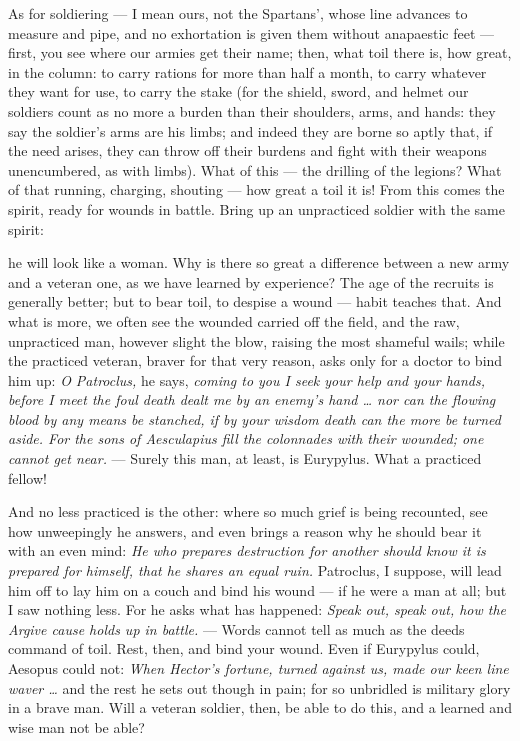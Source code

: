  As for soldiering — I mean ours, not the Spartans', whose line advances to measure and pipe, and no exhortation is given them without anapaestic feet — first, you see where our armies get their name; then, what toil there is, how great, in the column: to carry rations for more than half a month, to carry whatever they want for use, to carry the stake (for the shield, sword, and helmet our soldiers count as no more a burden than their shoulders, arms, and hands: they say the soldier's arms are his limbs; and indeed they are borne so aptly that, if the need arises, they can throw off their burdens and fight with their weapons unencumbered, as with limbs). What of this — the drilling of the legions? What of that running, charging, shouting — how great a toil it is! From this comes the spirit, ready for wounds in battle. Bring up an unpracticed soldier with the same spirit:

 he will look like a woman. Why is there so great a difference between a new army and a veteran one, as we have learned by experience? The age of the recruits is generally better; but to bear toil, to despise a wound — habit teaches that. And what is more, we often see the wounded carried off the field, and the raw, unpracticed man, however slight the blow, raising the most shameful wails; while the practiced veteran, braver for that very reason, asks only for a doctor to bind him up: \textit{O Patroclus,} he says, \textit{coming to you I seek your help and your hands, before I meet the foul death dealt me by an enemy's hand … nor can the flowing blood by any means be stanched, if by your wisdom death can the more be turned aside. For the sons of Aesculapius fill the colonnades with their wounded; one cannot get near.} — Surely this man, at least, is Eurypylus. What a practiced fellow!

 And no less practiced is the other: where so much grief is being recounted, see how unweepingly he answers, and even brings a reason why he should bear it with an even mind: \textit{He who prepares destruction for another should know it is prepared for himself, that he shares an equal ruin.} Patroclus, I suppose, will lead him off to lay him on a couch and bind his wound — if he were a man at all; but I saw nothing less. For he asks what has happened: \textit{Speak out, speak out, how the Argive cause holds up in battle.} — Words cannot tell as much as the deeds command of toil. Rest, then, and bind your wound. Even if Eurypylus could, Aesopus could not: \textit{When Hector's fortune, turned against us, made our keen line waver …} and the rest he sets out though in pain; for so unbridled is military glory in a brave man. Will a veteran soldier, then, be able to do this, and a learned and wise man not be able?


